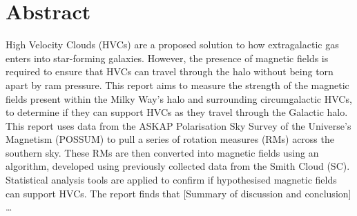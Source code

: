 \chapter*{Abstract}
\vspace{-1em}

High Velocity Clouds (HVCs) are a proposed solution to how extragalactic gas enters into star-forming galaxies. However, the presence of magnetic fields is required to ensure that HVCs can travel through the halo without being torn apart by ram pressure. This report aims to measure the strength of the magnetic fields present within the Milky Way’s halo and surrounding circumgalactic HVCs, to determine if they can support HVCs as they travel through the Galactic halo. This report uses data from the ASKAP Polarisation Sky Survey of the Universe’s Magnetism (POSSUM) to pull a series of rotation measures (RMs) across the southern sky. These RMs are then converted into magnetic fields using an algorithm, developed using previously collected data from the Smith Cloud (SC). Statistical analysis tools are applied to confirm if hypothesised magnetic fields can support HVCs. The report finds that [Summary of discussion and conclusion] …

